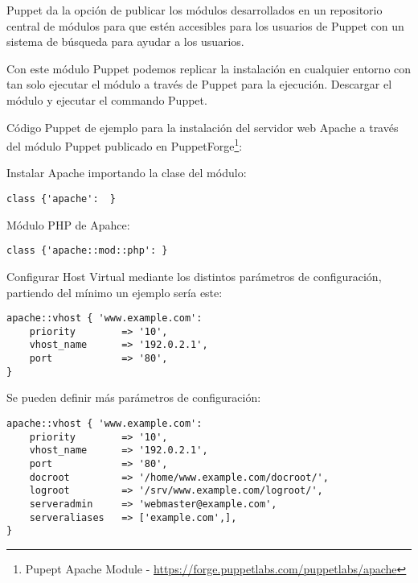 \par Puppet da la opción de publicar los módulos desarrollados en un repositorio central de módulos para que estén accesibles para los usuarios de Puppet con un sistema de búsqueda para ayudar a los usuarios.

\par Con este módulo Puppet podemos replicar la instalación en cualquier entorno con tan solo ejecutar el módulo a través de Puppet para la ejecución. Descargar el módulo y ejecutar el commando Puppet.

\par Código Puppet de ejemplo para la instalación del servidor web Apache a través del módulo Puppet publicado en PuppetForge\footnote{Pupept Apache Module - \url{https://forge.puppetlabs.com/puppetlabs/apache}}:

\par Instalar Apache importando la clase del módulo:

\lstset{style=rubybasico}
\begin{lstlisting}[frame=trbl]
class {'apache':  }
\end{lstlisting}

\par Módulo PHP de Apahce:

\lstset{style=rubybasico}
\begin{lstlisting}[frame=trbl]
class {'apache::mod::php': }
\end{lstlisting}

\par Configurar Host Virtual mediante los distintos parámetros de configuración, partiendo del mínimo un ejemplo sería este:

\lstset{style=rubybasico}
\begin{lstlisting}[frame=trbl]
apache::vhost { 'www.example.com':
    priority        => '10',
    vhost_name      => '192.0.2.1',
    port            => '80',
}
\end{lstlisting}

\par Se pueden definir más parámetros de configuración:

\lstset{style=rubybasico}
\begin{lstlisting}[frame=trbl]
apache::vhost { 'www.example.com':
    priority        => '10',
    vhost_name      => '192.0.2.1',
    port            => '80',
    docroot         => '/home/www.example.com/docroot/',
    logroot         => '/srv/www.example.com/logroot/',
    serveradmin     => 'webmaster@example.com',
    serveraliases   => ['example.com',],
}
\end{lstlisting}


